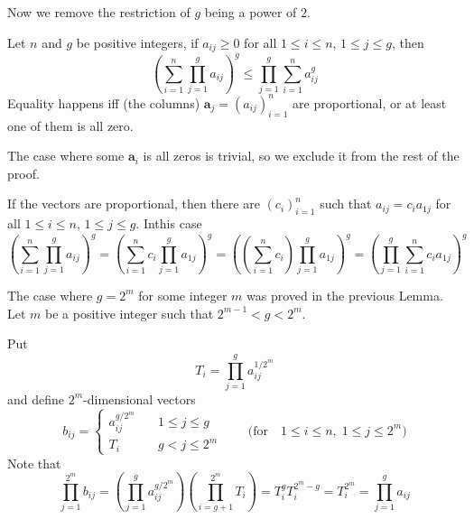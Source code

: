 Now we remove the restriction of $g$ being a power of $2$.
\begin{lem} \label{lem:cauchy:ng}
Let $n$ and $g$ be positive integers,
if \(a_{ij}\geq 0\)
for all \(1\leq i \leq n\), \(1\leq j \leq g\),
then
\begin{equation} \label{eq:eqgeom:n}
 \left(\sum_{i=1}^n \prod_{j=1}^g a_{ij}\right)^g
 \leq
 \prod_{j=1}^g \sum_{i=1}^n a_{ij}^g
\end{equation}
Equality happens iff (the columns)
\(\mathbf{a}_j = (a_{ij})_{i=1}^n\) are proportional, or at least
one of them is all zero.
\end{lem}
\begin{thmproof}
The case where some \(\mathbf{a}_i\) is all zeros is trivial,
so we exclude it from the rest of the proof.

If the vectors are proportional, then there are \((c_i)_{i=1}^n\)
such that \(a_{ij} = c_i a_{1j}\)
for all \(1\leq i \leq n\), \(1\leq j \leq g\). Inthis case
\begin{equation*}
\left(\sum_{i=1}^n \prod_{j=1}^g a_{ij}\right)^g =
\left(\sum_{i=1}^n c_i \prod_{j=1}^g a_{1j}\right)^g =
\left(\left(\sum_{i=1}^n c_i\right) \prod_{j=1}^g a_{1j}\right)^g =
\left(\prod_{j=1}^g \sum_{i=1}^n c_i a_{1j}\right)^g
\end{equation*}


The case where \(g=2^m\) for some integer $m$ was proved
in the previous Lemma.
Let $m$ be a positive integer such that \(2^{m-1} < g < 2^m\).

Put
\begin{equation*}
T_i = \prod_{j=1}^g a_{ij}^{1/{2^m}}
\end{equation*}
and define \(2^m\)-dimensional vectors
\begin{equation*}
b_{ij} = \left\{\begin{array}{ll}
               a_{ij}^{g/{2^m}} \quad & 1 \leq j \leq g\\
               T_i              \quad & g <    j \leq 2^m
               \end{array}\right.
               \qquad \textrm{(for}\quad 1\leq i \leq n, \;
                                         1 \leq j \leq 2^m \textrm{)}
\end{equation*}
Note that
\begin{equation*}
\prod_{j=1}^{2^m} b_{ij}
= \left(\prod_{j=1}^{g} a_{ij}^{g/{2^m}} \right)
  \left(\prod_{i=g+1}^{2^m} T_i \right)
= T_i^g T_i^{2^m-g} = T_i^{2^m}
= \prod_{j=1}^g a_{ij}
\end{equation*}


\end{thmproof}

